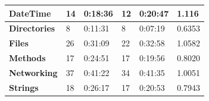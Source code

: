 \documentclass[12pt]{article}
\begin{document}
\begin{table}[ht]
{\begin{tabular}{|l|l|l|l|l|l|}
\textbf{DateTime}        & 14                                                                       & 0:18:36                                                                        & 12                                                                                        & 0:20:47                                                                         & 1.116                                                                            \\ \hline
\textbf{Directories}     & 8                                                                        & 0:11:31                                                                        & 8                                                                                         & 0:07:19                                                                         & 0.6353                                                                           \\ \hline
\textbf{Files}           & 26                                                                       & 0:31:09                                                                        & 22                                                                                        & 0:32:58                                                                         & 1.0582                                                                           \\ \hline
\textbf{Methods}         & 17                                                                       & 0:24:51                                                                        & 17                                                                                        & 0:19:56                                                                         & 0.8020                                                                           \\ \hline
\textbf{Networking}      & 37                                                                       & 0:41:22                                                                        & 34                                                                                        & 0:41:35                                                                         & 1.0051                                                                           \\ \hline
\textbf{Strings}         & 18                                                                       & 0:26:17                                                                        & 17                                                                                        & 0:20:53                                                                         & 0.7943                                                                           \\ \hline

\end{tabular}}
\end{table}
\end{document}
